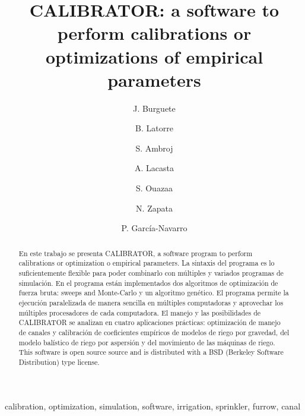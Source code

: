 \documentclass[review,authoryear]{elsarticle}
\begin{document}
\title{CALIBRATOR: a software to perform calibrations or optimizations of
empirical parameters}

\author[eead,bifi]{J. Burguete}

\author[eead]{B. Latorre}

\author[kit]{S. Ambroj}

\author[unizar]{A. Lacasta}

\author[eead]{S. Ouazaa}

\author[eead]{N. Zapata}

\author[unizar]{P. García-Navarro}


\address[eead]{Soil and Water, EEAD / CSIC.
P.O. Box 13034, 50080~Zaragoza, Spain.}
\address[bifi]{BIFI: Instituto de Biocomputación y Física de Sistemas Complejos,
Universidad de Zaragoza.
Mariano Esquillor, Edificio I+D, 50009~Zaragoza, Spain.}
\address[kit]{Steinbuch Centre for Computing (SCC),
Karlsruhe Institute of Technology (KIT).
KIT-Campus Nord, Hermann von Helmholtzplatz 1, 76344 Eggenstein - Leopoldshafen,
Germany.}
\address[unizar]{Fluid Mechanics, LIFTEC, CSIC-Universidad de Zaragoza.
María de Luna 3, 50018~Zaragoza, Spain.}

\begin{keyword}
calibration, optimization, simulation, software, irrigation, sprinkler, furrow,
canal
\end{keyword}

\begin{abstract}
En este trabajo se presenta CALIBRATOR, a software program to perform
calibrations or optimization o empirical parameters. La sintaxis del programa es
lo suficientemente flexible para poder combinarlo con múltiples y variados
programas de simulación.
En el programa están implementados dos algoritmos de optimización de fuerza
bruta: sweeps and Monte-Carlo y un algoritmo genético.
El programa permite la ejecución paralelizada de manera sencilla en múltiples
computadoras y aprovechar los múltiples procesadores de cada computadora.
El manejo y las posibilidades de CALIBRATOR se analizan en cuatro aplicaciones
prácticas: optimización de manejo de canales y calibración de coeficientes
empíricos de modelos de riego por gravedad, del modelo balístico de riego por
aspersión y del movimiento de las máquinas de riego.
This software is open source source and is distributed with a BSD (Berkeley
Software Distribution) type license.
\end{abstract}
\end{document}
